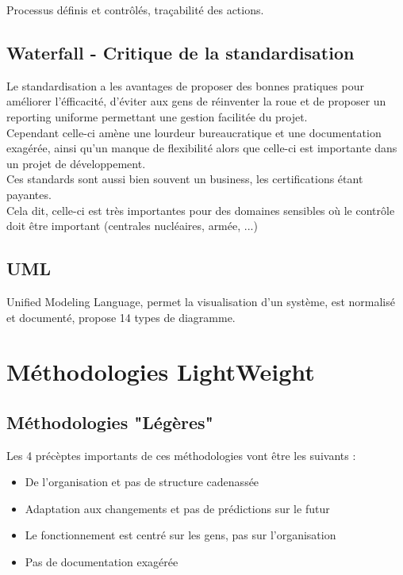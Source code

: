 \documentclass{report}
\begin{document}
		Processus définis et contrôlés, traçabilité des actions.\\

	\section{Waterfall - Critique de la standardisation}

		Le standardisation a les avantages de proposer des bonnes pratiques pour améliorer l'éfficacité, d'éviter aux gens de réinventer la roue et de proposer un reporting uniforme permettant une gestion facilitée du projet.\\

		Cependant celle-ci amène une lourdeur bureaucratique et une documentation exagérée, ainsi qu'un manque de flexibilité alors que celle-ci est importante dans un projet de développement.\\

		Ces standards sont aussi bien souvent un business, les certifications étant payantes.\\

		Cela dit, celle-ci est très importantes pour des domaines sensibles où le contrôle doit être important (centrales nucléaires, armée, ...)\\

	\section{UML}

		Unified Modeling Language, permet la visualisation d'un système, est normalisé et documenté, propose 14 types de diagramme.\\

\chapter{Méthodologies LightWeight}
	
	\section{Méthodologies "Légères"}

		Les 4 précèptes importants de ces méthodologies vont être les suivants : \\

		\begin{itemize}
			\item De l'organisation et pas de structure cadenassée
			\item Adaptation aux changements et pas de prédictions sur le futur
			\item Le fonctionnement est centré sur les gens, pas sur l'organisation
			\item Pas de documentation exagérée
		\end{itemize}
\end{document}
